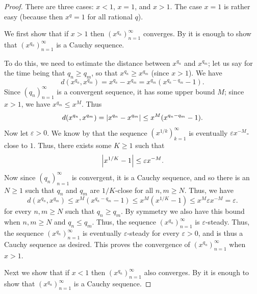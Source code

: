 \begin{proof}
  There are three cases: \(x < 1\), \(x = 1\), and \(x > 1\).
  The case \(x = 1\) is rather easy (because then \(x^q = 1\) for all rational \(q\)).

  We first show that if \(x > 1\) then \((x^{q_n})_{n = 1}^\infty\) converges.
  By  it is enough to show that \((x^{q_n})_{n = 1}^\infty\) is a Cauchy sequence.

  To do this, we need to estimate the distance between \(x^{q_n}\) and \(x^{q_m}\);
  let us say for the time being that \(q_n \geq q_m\), so that \(x^{q_n} \geq x^{q_m}\) (since \(x > 1\)).
  We have
  \[
    d(x^{q_n}, x^{q_m}) = x^{q_n} - x^{q_m} = x^{q_m} (x^{q_n - q_m} - 1).
  \]
  Since \((q_n)_{n = 1}^\infty\) is a convergent sequence, it has some upper bound \(M\);
  since \(x > 1\), we have \(x^{q_m} \leq x^M\).
  Thus
  \[
    d(x^{q_n}, x^{q_m}) = \left\lvert x^{q_n} - x^{q_m}\right\rvert \leq x^M (x^{q_n - q_m} - 1).
  \]
  Now let \(\varepsilon > 0\).
  We know by  that the sequence \((x^{1 / k})_{k = 1}^\infty\) is eventually \(\varepsilon x^{-M}\)-close to \(1\).
  Thus, there exists some \(K \geq 1\) such that
  \[
    \left\lvert x^{1 / K} - 1\right\rvert \leq \varepsilon x^{-M}.
  \]
  Now since \((q_n)_{n = 1}^\infty\) is convergent, it is a Cauchy sequence, and so there is an \(N \geq 1\) such that \(q_n\) and \(q_m\) are \(1 / K\)-close for all \(n, m \geq N\).
  Thus, we have
  \[
    d(x^{q_n}, x^{q_m}) \leq x^M (x^{q_n - q_m} - 1) \leq x^M (x^{1 / K} - 1) \leq x^M \varepsilon x^{-M} = \varepsilon.
  \]
  for every \(n, m \geq N\) such that \(q_n \geq q_m\).
  By symmetry we also have this bound when \(n, m \geq N\) and \(q_n \leq q_m\).
  Thus, the sequence \((x^{q_n})_{n = 1}^\infty\) is \(\varepsilon\)-steady.
  Thus, the sequence \((x^{q_n})_{n = 1}^\infty\) is eventually \(\varepsilon\)-steady for every \(\varepsilon > 0\), and is thus a Cauchy sequence as desired.
  This proves the convergence of \((x^{q_n})_{n = 1}^\infty\) when \(x > 1\).

  Next we show that if \(x < 1\) then \((x^{q_n})_{n = 1}^\infty\) also converges.
  By  it is enough to show that \((x^{q_n})_{n = 1}^\infty\) is a Cauchy sequence.


\end{proof}
